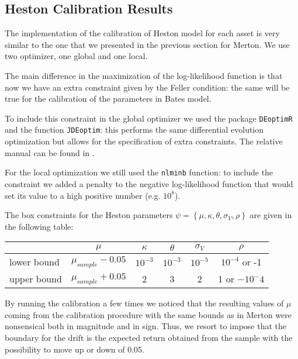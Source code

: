 \subsection{Heston Calibration Results}

The implementation of the calibration of Heston model for each asset is very similar to the one that we presented in the previous section for Merton. We use two optimizer, one global and one local.

The main difference in the maximization of the log-likelihood function is that now we have an extra constraint given by the Feller condition: the same will be true for the calibration of the parameters in Bates model.

To include this constraint in the global optimizer we used the package \texttt{DEoptimR} and the function \texttt{JDEoptim}: this performs the same differential evolution optimization but allows for the specification of extra constraints. The relative manual can be found in \cite{DEoptimR_manual}.

For the local optimization we still used the \texttt{nlminb} function: to include the constraint we added a penalty to the negative log-likelihood function that would set its value to a high positive number (e.g. $10^8$).

The box constraints for the Heston parameters $\psi =  \left\{ \mu, \kappa, \theta, \sigma_V, \rho \right\}$ are given in the following table:

\bigskip

\begin{center}
	\begin{tabular}{lccccc}
		&$\mu$ & $\kappa$ & $\theta$ & $\sigma_V$ & $\rho$ \\
		\midrule
		lower bound & $\mu_{sample}-0.05$ & $10^{-3}$ & $10^{-3}$ &$10^{-5}$ &$10^{-4}$ or -1\\
		upper bound & $\mu_{sample}+0.05 $& 2 & 3 & 2& 1 or $-10^-4$ \\
		\midrule
	\end{tabular}
\end{center}

\bigskip

By running the calibration a few times we noticed that the resulting values of $\mu$ coming from the calibration procedure with the same bounds as in Merton were nonsensical both in magnitude and in sign. Thus, we resort to impose that the boundary for the drift is the expected return obtained from the sample with the possibility to move up or down of 0.05.

